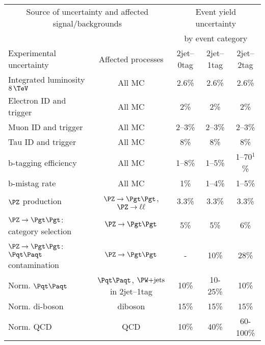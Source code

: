 
\begin{table}[tbhp]
\small
\begin{center}
    \begin{tabular}{|l|c|c|c|c|}
    \hline
    \multicolumn{2}{|c|}{Source of uncertainty and affected signal/backgrounds} & \multicolumn{3}{|c|}{Event yield uncertainty}  \\
    \multicolumn{2}{|c|}{} & \multicolumn{3}{|c|}{by event category} \\
    \hline
     Experimental uncertainty                                  & Affected processes &  2jet--0tag    &  2jet--1tag  &  2jet--2tag      \\
     \hline
     Integrated luminosity $8\,\TeV$                           & All MC & 2.6\% & 2.6\% & 2.6\%       \\
     Electron ID and trigger                                   & All MC &  2\%  & 2\%  & 2\%       \\
     Muon ID and trigger                                       & All MC & 2--3\%  &   2--3\%    & 2--3\%       \\
     Tau ID and trigger                                        & All MC & 8\%  & 8\% & 8\%           \\
     b-tagging efficiency                                      & All MC & 1--8\% & 1--5\%  & 1--70$^{1}$\% \\
     b-mistag rate                                             & All MC & 1\%  & 1--4\%  & 1--5\%       \\
     \hline
     $\PZ$ production                                          & $\ZToTauTau$, $\PZ\to\ell\ell$ & 3.3\%     &   3.3\%    & 3.3\%      \\
     $\PZ\to\Pgt\Pgt$: category selection                      & $\ZToTauTau$ & 5\%  & 5\% & 6\%        \\
     $\PZ\to\Pgt\Pgt$: $\ttbar$ contamination                  & $\ZToTauTau$ & - & 10\% & 28\%        \\
     Norm. $\ttbar$                                            & $\ttbar$, $\WJets$ in 2jet--1tag & 10\%  &   10-25\%  &  10\%        \\
     Norm. di-boson                                            & diboson & 15\%   &   15\%  &  15\%      \\
     Norm. QCD                                                 & QCD  & 10\%    &   40\% & 60-100\%         \\

\end{tabular}
\end{center}
\end{table}
